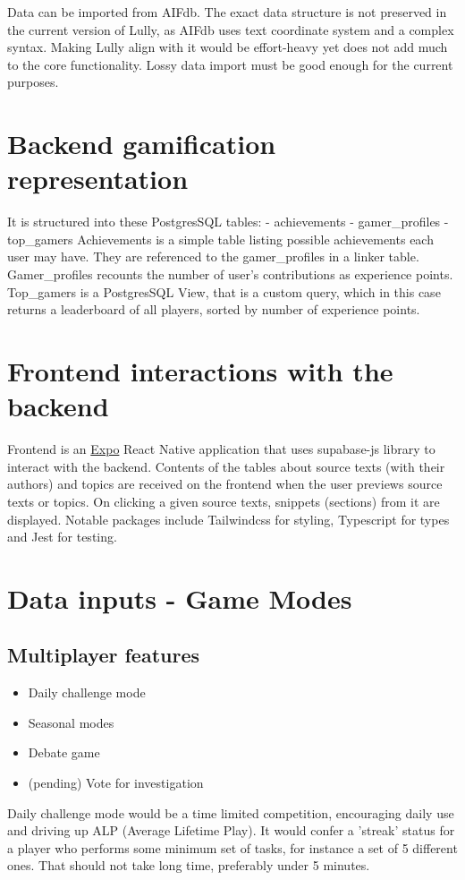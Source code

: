 \documentclass{report}
\begin{document}
Data can be imported from AIFdb. The exact data structure is not preserved in the current version of Lully, as AIFdb uses text coordinate system and a complex syntax. Making Lully align with it would be effort-heavy yet does not add much to the core functionality. Lossy data import must be good enough for the current purposes.

\section{Backend gamification representation}

It is structured into these PostgresSQL tables:
- achievements
- gamer_profiles 
- top_gamers 
Achievements is a simple table listing possible achievements each user may have. They are referenced to the gamer_profiles in a linker table. Gamer_profiles recounts the number of user's contributions as experience points.
Top_gamers is a PostgresSQL View, that is a custom query, which in this case returns a leaderboard of all players, sorted by number of experience points.

\section{Frontend interactions with the backend}

Frontend is an \href{https://expo.dev/}{Expo} React Native application that uses supabase-js library to interact with the backend.
Contents of the tables about source texts (with their authors) and topics are received on the frontend when the user previews source texts or topics. On clicking a given source texts, snippets (sections) from it are displayed.
Notable packages include Tailwindcss for styling, Typescript for types and Jest for testing. 

\section{Data inputs - Game Modes}
\subsection{Multiplayer features}
\begin{itemize}
  \item Daily challenge mode
  \item Seasonal modes
  \item Debate game
  \item (pending) Vote for investigation
\end{itemize}
Daily challenge mode would be a time limited competition, encouraging daily use and driving up ALP (Average Lifetime Play). It would confer a 'streak' status for a player who performs some minimum set of tasks, for instance a set of 5 different ones. That should not take long time, preferably under 5 minutes.
\end{document}
